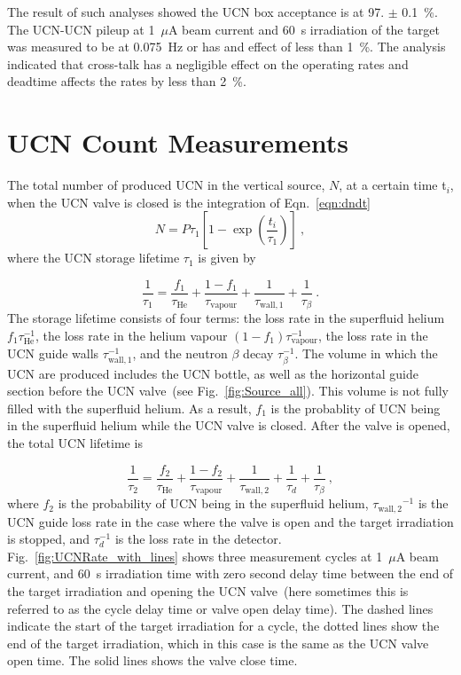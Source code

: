 The result of such analyses showed the UCN box acceptance is at
97. $\pm$ 0.1~\%. The UCN-UCN pileup at 1~$\mu$A beam current and 60~s
irradiation of the target was measured to be at 0.075~Hz or has and
effect of less than 1~\%. The analysis indicated that cross-talk has a
negligible effect on the operating rates and deadtime affects the
rates by less than 2~\%.



\section{UCN Count Measurements \label{UCNCounts}}

The total number of produced UCN in the vertical source, $N$, at a
certain time t$_i$, when the UCN valve is closed is the integration of
Eqn.~\ref{eqn:dndt}
\begin{equation}
  \label{eq:totalUCN}
  N = P \tau_1\left[ 1- \exp \left(\frac{t_i }{ \tau_1}\right) \right]~,
\end{equation}
where the UCN storage lifetime $\tau_1$ is given by

\begin{equation}
  \label{eqn:tau1}
  \frac{1}{\tau_1} = \frac{ f_1}{\tau_\mathrm{He}} + \frac{1-f_1}{\tau_\mathrm{vapour}}+\frac{1}{\tau_\mathrm{wall,1}} + \frac{1}{\tau_\beta}~.
\end{equation}
The storage lifetime consists of four terms: the loss rate in the
superfluid helium $ f_1\tau_\mathrm{He}^{-1}$, the loss rate in the
helium vapour $(1-f_1)\tau_\mathrm{vapour}^{-1}$, the loss rate in the
UCN guide walls $\tau_\mathrm{wall,1}^{-1}$, and the neutron $\beta$
decay $\tau_\beta^{-1}$. The volume in which the UCN are produced
includes the UCN bottle, as well as the horizontal guide section
before the UCN valve~(see Fig.~\ref{fig:Source_all}). This volume is
not fully filled with the superfluid helium. As a result, $ f_1$ is
the probablity of UCN being in the superfluid helium while the UCN
valve is closed. After the valve is opened, the total UCN lifetime is

\begin{equation}
  \label{eqn:tau2}
  \frac{1}{\tau_2} = \frac{ f_2}{\tau_\mathrm{He}} + \frac{1-f_2}{\tau_\mathrm{vapour}}+ \frac{1}{\tau_\mathrm{wall,2}}+\frac{1}{\tau_d} + \frac{1}{\tau_\beta}~,
\end{equation}
where $f_2$ is the probability of UCN being in the superfluid helium,
${\tau_\mathrm{wall,2}}^{-1}$ is the UCN guide loss rate in the case
where the valve is open and the target irradiation is stopped, and
$\tau_d^{-1}$ is the loss rate in the
detector. Fig.~\ref{fig:UCNRate_with_lines} shows three measurement
cycles at 1~$\mu$A beam current, and 60~s irradiation time with zero
second delay time between the end of the target irradiation and
opening the UCN valve~(here sometimes this is referred to as the cycle
delay time or valve open delay time). The dashed lines indicate the
start of the target irradiation for a cycle, the dotted lines show the
end of the target irradiation, which in this case is the same as the
UCN valve open time. The solid lines shows the valve close time.


